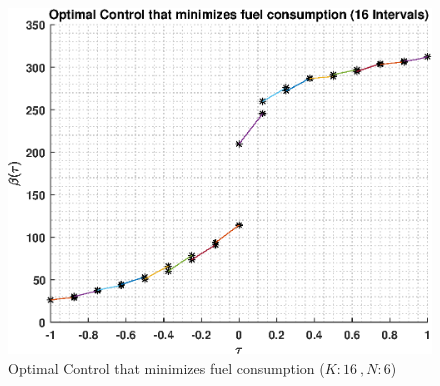 \documentclass[]{article}
\begin{document}
\begin{figure}
	\centering
	\includegraphics[scale=0.50]{directControlK16Poly6.eps}
	\caption{Optimal Control that minimizes fuel consumption (\(K:16\ , N:6\))}
	\label{fig:directControlK16Poly6}
\end{figure}
\end{document}
